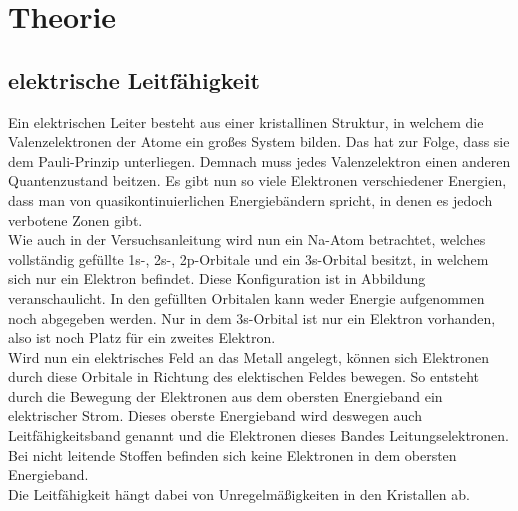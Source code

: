 \section{Theorie}
\label{sec:Theorie}
\subsection{elektrische Leitfähigkeit}
Ein elektrischen Leiter besteht aus einer kristallinen Struktur, in welchem die Valenzelektronen der Atome
ein großes System bilden. Das hat zur Folge, dass sie dem Pauli-Prinzip unterliegen. Demnach muss jedes 
Valenzelektron einen anderen Quantenzustand beitzen. Es gibt nun so viele Elektronen verschiedener Energien,
dass man von quasikontinuierlichen Energiebändern spricht, in denen es jedoch verbotene Zonen gibt.\\
Wie auch in der Versuchsanleitung %
wird nun ein Na-Atom betrachtet, welches vollständig gefüllte 1s-, 2s-, 2p-Orbitale und ein 3s-Orbital besitzt,
in welchem sich nur ein Elektron befindet. Diese Konfiguration ist in Abbildung %
veranschaulicht. In den gefüllten Orbitalen kann weder Energie aufgenommen noch abgegeben werden. Nur in dem
3s-Orbital ist nur ein Elektron vorhanden, also ist noch Platz für ein zweites Elektron.\\
%
%
Wird nun ein 
elektrisches Feld an das Metall angelegt, können sich Elektronen durch diese Orbitale in Richtung des 
elektischen Feldes bewegen. So entsteht durch die Bewegung der Elektronen aus dem obersten Energieband
ein elektrischer Strom. Dieses oberste Energieband wird deswegen auch Leitfähigkeitsband genannt und die 
Elektronen dieses Bandes Leitungselektronen. Bei nicht leitende Stoffen befinden sich keine Elektronen in dem
obersten Energieband.\\
Die Leitfähigkeit hängt dabei von Unregelmäßigkeiten in den Kristallen ab.
